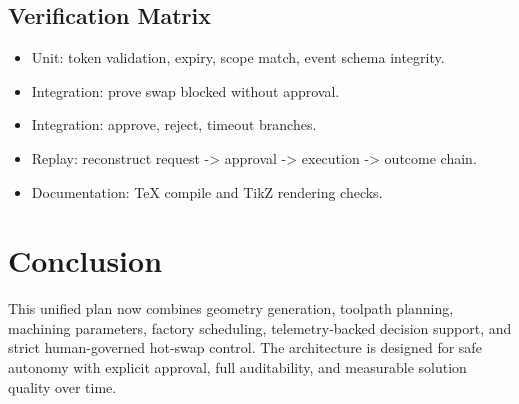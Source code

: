 \documentclass{article}
\begin{document}
\subsection{Verification Matrix}
\begin{itemize}
\item Unit: token validation, expiry, scope match, event schema integrity.
\item Integration: prove swap blocked without approval.
\item Integration: approve, reject, timeout branches.
\item Replay: reconstruct request -> approval -> execution -> outcome chain.
\item Documentation: TeX compile and TikZ rendering checks.
\end{itemize}

\section{Conclusion}
This unified plan now combines geometry generation, toolpath planning, machining parameters, factory scheduling, telemetry-backed decision support, and strict human-governed hot-swap control. The architecture is designed for safe autonomy with explicit approval, full auditability, and measurable solution quality over time.
\end{document}
